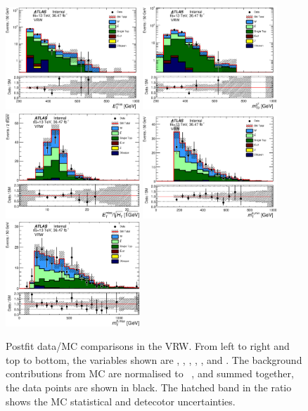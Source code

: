\begin{figure}[!htb]
  \centering
  \includegraphics[width=0.45\textwidth]{figures/wJets/postfit/Met_VRW_log.eps}
  \includegraphics[width=0.45\textwidth]{figures/wJets/postfit/MT2Chi2_VRW_log.eps}
  \includegraphics[width=0.45\textwidth]{figures/wJets/postfit/HtSig_VRW.eps}
  \includegraphics[width=0.45\textwidth]{figures/wJets/postfit/MtBMin_VRW.eps}
  \includegraphics[width=0.45\textwidth]{figures/wJets/postfit/MtBMax_VRW.eps}
  \caption{Postfit data/MC comparisons in the VRW. From left to right and top to bottom, the variables shown are \met, \mtbmin, \mtbmax, \mantikttwelvezero, \mantikttwelveone, and \mantikteightzero. The background contributions from MC are normalised to \intlumi\ \ifb, and summed together, the data points are shown in black. The hatched band in the ratio shows the MC statistical and detecotor uncertainties.}
  \label{fig:VRW}
\end{figure}

